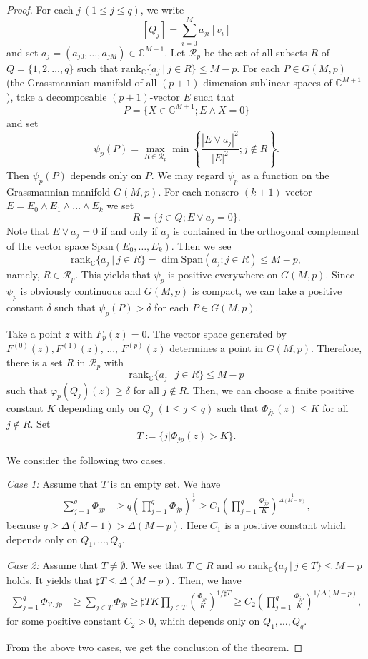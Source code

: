 \documentclass[12pt]{amsart}
\newcommand{\C}{{\mathbb{C}}}
\newcommand{\rank}{\mathrm{rank}}
\begin{document}
\begin{proof}
For each $j\ (1\le j\le q)$, we write
$$ [Q_j]=\sum_{i=0}^Ma_{ji}[v_i] $$
and set $a_j=(a_{j0},\ldots,a_{jM})\in\C^{M+1}$. Let $\mathcal R_p$ be the set of all subsets $R$ of $Q=\{1,2,\ldots, q\}$  such that $\rank_{\C}\{a_j\ |\ j\in R\}\le M-p$. For each $P\in G(M,p)$ (the Grassmannian manifold of all $(p+1)$-dimension sublinear spaces of $\C^{M+1}$), take a decomposable $(p+1)$-vector $E$ such that
$$ P=\{X\in\C^{M+1}; E\wedge X=0\}$$
and set
$$ \psi_p(P)=\underset{R\in\mathcal R_p}{\max}\min\left\{\dfrac{\left|E\vee a_j\right|^2}{|E|^2};j\not\in R\right\}. $$
Then $\psi_p(P)$ depends only on $P$. We may regard $\psi_p$ as a function on the Grassmannian manifold $G(M,p)$. For each nonzero $(k+1)$-vector $E=E_0\wedge E_1\wedge\ldots\wedge E_k$ we set
$$R=\{j\in Q; E\vee a_j=0\}.$$
Note that $E\vee a_j=0$ if and only if $a_j$ is contained in the orthogonal complement of the vector space $\mathrm{Span}(E_0,\ldots, E_k)$. Then we see
$$\rank_{\C}\{a_j\ |\ j\in R\}=\dim\mathrm{Span}(a_j; j\in R)\le M - p,$$
namely, $R\in\mathcal R_p$. This yields that $\psi_p$ is positive everywhere on $G(M,p)$.
Since $\psi_p$ is obviously continuous and $G(M,p)$ is compact, we can take a positive constant $\delta$ such that $\psi_p(P)>\delta$ for each $P\in G(M,p)$.

Take a point $z$ with $F_{p}(z)=0$. The vector space generated
by $F^{(0)}(z), F^{(1)}(z)$, ..., $F^{(p)}(z)$ determines a point in $G(M,p)$. Therefore, there is a set $R$ in $\mathcal R_p$ with 
$$ \rank_{\C}\{a_j\ |\ j\in R\}\le M-p $$ 
such that $\varphi_{p}(Q_j)(z)\ge\delta$ for all $j\not\in R$. Then, we can choose a finite positive constant $K$ depending only on $Q_j\ (1\le j\le q)$ such that $\Phi_{jp}(z)\le K$ for all $j\not\in R$. Set
$$T:= \{j| \Phi_{jp}(z)> K\}.$$

We consider the following two cases.

\textit{Case 1: }Assume that $T$ is an empty set. We have
\begin{align*}
\sum_{j=1}^q\Phi_{jp}&\ge  q\left (\prod_{j=1}^q\Phi_{jp}\right)^{\frac{1}{q}}\ge C_1\left (\prod_{j=1}^q\frac{\Phi_{jp}}{K}\right)^{\frac{1}{\Delta(M-p)}},
\end{align*}
because $q\ge\Delta(M+1)>\Delta(M-p)$. Here $C_1$ is a  positive constant which depends only on $Q_1,\ldots,Q_q$.

\textit{Case 2: }Assume that $T\ne\emptyset$. We see that $T\subset R$ and so $\rank_{\C}\{a_j\ |\ j\in T\}\le M-p$ holds. It yields that $\sharp T\le\Delta(M-p)$. Then, we have
\begin{align*}
\sum_{j=1}^q\Phi_{\mathcal V,jp}&\ge\sum_{j\in T}\Phi_{jp}\ge \sharp TK\prod_{j\in T}\left(\frac{\Phi_{jp}}{K}\right)^{1/\sharp T}\ge C_2\left(\prod_{j=1}^q\frac{\Phi_{jp}}{K}\right)^{1/\Delta(M-p)},
\end{align*}
for some positive constant $C_2>0$, which depends only on $Q_1,\ldots,Q_q$.

From the above two cases, we get the conclusion of the theorem.
\end{proof}
\end{document}
